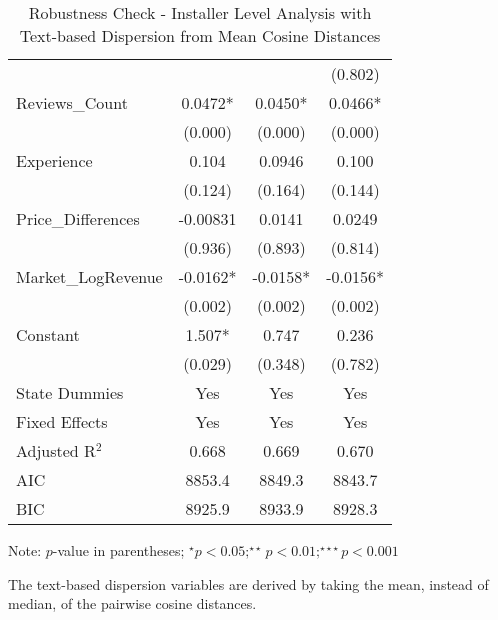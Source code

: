\begin{table}[]
\begin{threeparttable}
\begin{tabular}{@{}lccc@{}}
                                                           &            &            & (0.802)    \\
Reviews\_Count                                              & 0.0472*    & 0.0450*    & 0.0466*    \\
                                                           & (0.000)    & (0.000)    & (0.000)    \\
Experience                                                 & 0.104      & 0.0946     & 0.100      \\
                                                           & (0.124)    & (0.164)    & (0.144)    \\
Price\_Differences                                         & -0.00831   & 0.0141     & 0.0249     \\
                                                           & (0.936)    & (0.893)    & (0.814)    \\
Market\_LogRevenue                                         & -0.0162*   & -0.0158*   & -0.0156*   \\
                                                           & (0.002)    & (0.002)    & (0.002)    \\
Constant                                                   & 1.507*     & 0.747      & 0.236      \\
                                                           & (0.029)    & (0.348)    & (0.782)    \\
State Dummies  & Yes        & Yes        & Yes        \\
Fixed Effects  & Yes        & Yes        & Yes        \\
Adjusted R$^2$                                             & 0.668      & 0.669      & 0.670      \\
AIC                                                        & 8853.4     & 8849.3     & 8843.7     \\
BIC                                                        & 8925.9     & 8933.9     & 8928.3     \\ \bottomrule
\end{tabular}
\begin{tablenotes}
\item Note: $p$-value in parentheses; $^\star p<0.05;^{\star\star} p<0.01;^{\star\star\star} p<0.001 $
\item The text-based dispersion variables are derived by taking the mean, instead of median, of the pairwise cosine distances.
\end{tablenotes}
\end{threeparttable}
\vspace{10pt}
\caption{Robustness Check - Installer Level Analysis with Text-based Dispersion from Mean Cosine Distances}
\label{reg_ind_rob_text_mean}
\end{table} 